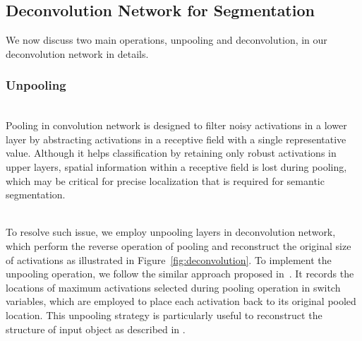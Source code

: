\documentclass[10pt,twocolumn,letterpaper]{article}
\begin{document}
\subsection{Deconvolution Network for Segmentation}
\label{sub:deconvolution}
We now discuss two main operations, unpooling and deconvolution, in our deconvolution network in details.

\subsubsection{Unpooling}
\label{sec:unpooling}
\iffalse
Modern CNN architectures utilize max pooling which picks maximum activations within its receptive field. 
Since this operation efficiently select robust activation values, by applying this operation with multiple stride, upper layer tend to have a small number of activations with robust information. Even if this operation gives tremendous advantage in classification task ~\cite{Constrainedtime}, it also makes difficulty for the tasks which needs precise localization like semantic segmentation, because location information is lost during this operation. 
\fi

\ifdefined{} \\ \fi
Pooling in convolution network is designed to filter noisy activations in a lower layer by abstracting activations in a receptive field with a single representative value.
Although it helps classification by retaining only robust activations in upper layers, spatial information within a receptive field is lost during pooling, which may be critical for precise localization that is required for semantic segmentation.  

\iffalse
Since pooling layer down scale the size of activation map by selecting representative values, we have to define unpooling, which is reverse operation of pooling, to generate set of activation correspondingly sized with the input activations before pooling operation. 
However, this problem is non-trivial since location information is lost through pooling. 
To deal with this problem, we keep the location of maximum activations while pooling and use it for unpooling. 
We call this locations as switch.  
\fi

\ifdefined{} \\ \fi
To resolve such issue, we employ unpooling layers in deconvolution network, which perform the reverse operation of pooling and reconstruct the original size of activations as illustrated in Figure~\ref{fig:deconvolution}.
To implement the unpooling operation, we follow the similar approach proposed in~\cite{Visandund,Deconvnet}. 
It records the locations of maximum activations selected during pooling operation in switch variables, which are employed to place each activation back to its original pooled location. 
This unpooling strategy is particularly useful to reconstruct the structure of input object as described in \cite{Visandund}.
\end{document}
